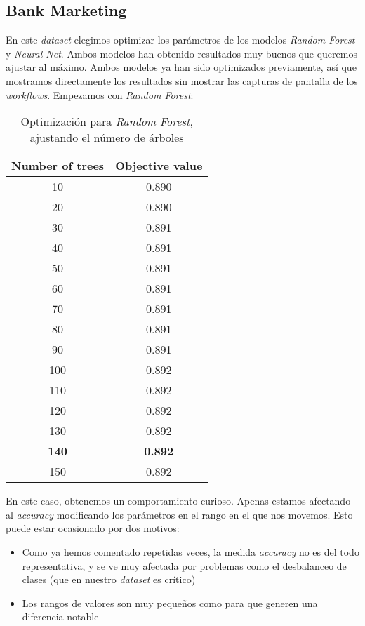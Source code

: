\documentclass[11pt]{article}
\begin{document}
\pagebreak

\subsection{Bank Marketing}

En este \emph{dataset} elegimos optimizar los parámetros de los modelos \emph{Random Forest} y \emph{Neural Net}. Ambos modelos han obtenido resultados muy buenos que queremos ajustar al máximo. Ambos modelos ya han sido optimizados previamente, así que mostramos directamente los resultados sin mostrar las capturas de pantalla de los \emph{workflows}. Empezamos con \emph{Random Forest}:

\begin{table}[H]
\begin{center}
    \begin{tabular}{|c|c|}
        \hline
        Number of trees & Objective value \\
        \hline
        10 & 0.890 \\
        20 & 0.890 \\
        30 & 0.891 \\
        40 & 0.891 \\
        50 & 0.891 \\
        60 & 0.891 \\
        70 & 0.891 \\
        80 & 0.891 \\
        90 & 0.891 \\
        100 & 0.892 \\
        110 & 0.892 \\
        120 & 0.892 \\
        130 & 0.892 \\
        \textbf{140} & \textbf{0.892} \\
        150 & 0.892 \\
        \hline
    \end{tabular}
\end{center}
    \caption{Optimización para \emph{Random Forest}, ajustando el número de árboles}
\end{table}

En este caso, obtenemos un comportamiento curioso. Apenas estamos afectando al \emph{accuracy} modificando los parámetros en el rango en el que nos movemos. Esto puede estar ocasionado por dos motivos:

\begin{itemize}
    \item Como ya hemos comentado repetidas veces, la medida \emph{accuracy} no es del todo representativa, y se ve muy afectada por problemas como el desbalanceo de clases (que en nuestro \emph{dataset} es crítico)
    \item Los rangos de valores son muy pequeños como para que generen una diferencia notable
\end{itemize}
\end{document}
